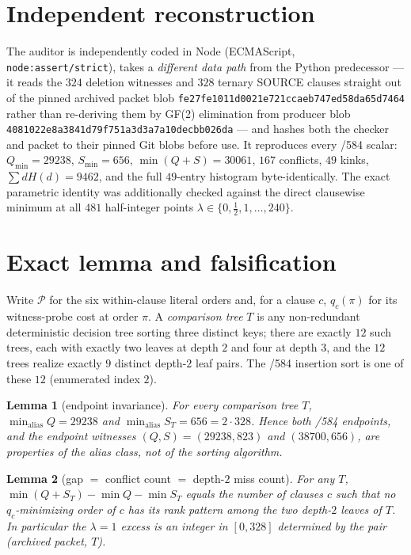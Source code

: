 \documentclass[11pt]{article}
\newtheorem{lemma}{Lemma}
\begin{document}
\section*{Independent reconstruction}
The auditor is independently coded in Node (ECMAScript, \verb|node:assert/strict|), takes a \emph{different data path} from the Python predecessor --- it reads the $324$ deletion witnesses and $328$ ternary SOURCE clauses straight out of the pinned archived packet blob \texttt{fe27fe1011d0021e721ccaeb747ed58da65d7464} rather than re-deriving them by GF(2) elimination from producer blob \texttt{4081022e8a3841d79f751a3d3a7a10decbb026da} --- and hashes both the checker and packet to their pinned Git blobs before use. It reproduces every /584 scalar: $Q_{\min}=29238$, $S_{\min}=656$, $\min(Q+S)=30061$, $167$ conflicts, $49$ kinks, $\sum dH(d)=9462$, and the full $49$-entry histogram byte-identically. The exact parametric identity was additionally checked against the direct clausewise minimum at all $481$ half-integer points $\lambda\in\{0,\tfrac12,1,\dots,240\}$.

\section*{Exact lemma and falsification}
Write $\mathcal P$ for the six within-clause literal orders and, for a clause $c$, $q_c(\pi)$ for its witness-probe cost at order $\pi$. A \emph{comparison tree} $T$ is any non-redundant deterministic decision tree sorting three distinct keys; there are exactly $12$ such trees, each with exactly two leaves at depth $2$ and four at depth $3$, and the $12$ trees realize exactly $9$ distinct depth-$2$ leaf pairs. The /584 insertion sort is one of these $12$ (enumerated index $2$).

\begin{lemma}[endpoint invariance]
For every comparison tree $T$, $\min_{\text{alias}}Q=29238$ and $\min_{\text{alias}}S_T=656=2\cdot 328$. Hence both /584 endpoints, and the endpoint witnesses $(Q,S)=(29238,823)$ and $(38700,656)$, are properties of the alias class, not of the sorting algorithm.
\end{lemma}

\begin{lemma}[gap $=$ conflict count $=$ depth-$2$ miss count]
For any $T$, $\min(Q+S_T)-\min Q-\min S_T$ equals the number of clauses $c$ such that \emph{no} $q_c$-minimizing order of $c$ has its rank pattern among the two depth-$2$ leaves of $T$. In particular the $\lambda=1$ excess is an integer in $[0,328]$ determined by the pair (archived packet, $T$).
\end{lemma}
\end{document}
